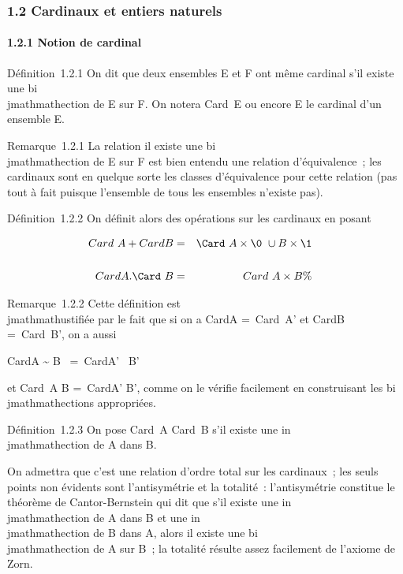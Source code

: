 
\subsubsection{1.2 Cardinaux et entiers naturels}

\paragraph{1.2.1 Notion de cardinal}

Définition~1.2.1 On dit que deux ensembles E et F ont même cardinal s'il
existe une bi\\jmathmathection de E sur F. On notera
Card~E ou encore E le
cardinal d'un ensemble E.

Remarque~1.2.1 La relation il existe une bi\\jmathmathection de E sur F est bien
entendu une relation d'équivalence~; les cardinaux sont en quelque sorte
les classes d'équivalence pour cette relation (pas tout à fait puisque
l'ensemble de tous les ensembles n'existe pas).

Définition~1.2.2 On définit alors des opérations sur les cardinaux en
posant

\begin{align*} Card~A
+ CardB& =& \Card~A
\times\0\ \cup B
\times\1\\%
\\
CardA.\Card~B& =&
Card~A \times B \%&
\\ \end{align*}

Remarque~1.2.2 Cette définition est \\jmathmathustifiée par le fait que si on a
CardA =\ Card~A' et
CardB =\ Card~B', on a
aussi

CardA \times\0\~ \cup
B \times\1\ =\
CardA' \times\0\ \cup B'
\times\1\

et Card~A \times B =\
CardA' \times B', comme on le vérifie facilement en construisant les
bi\\jmathmathections appropriées.

Définition~1.2.3 On pose Card~A
\leq Card~B s'il existe une in\\jmathmathection de A dans B.

On admettra que c'est une relation d'ordre total sur les cardinaux~; les
seuls points non évidents sont l'antisymétrie et la totalité~:
l'antisymétrie constitue le théorème de Cantor-Bernstein qui dit que
s'il existe une in\\jmathmathection de A dans B et une in\\jmathmathection de B dans A,
alors il existe une bi\\jmathmathection de A sur B~; la totalité résulte assez
facilement de l'axiome de Zorn.

